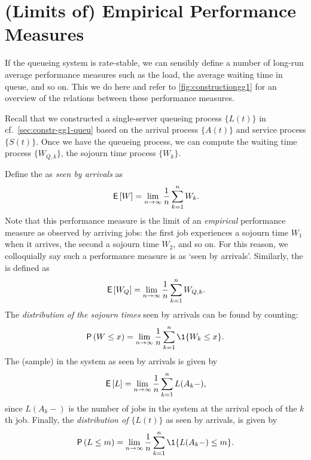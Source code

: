 \documentclass[companion]{subfiles}
\begin{document}
\section{(Limits of) Empirical Performance Measures}
\label{sec:limits-of-empirical}
If the queueing system is rate-stable, we can sensibly define a number of long-run average performance measures such as the load, the average waiting time in queue, and so on. 
This we do here and refer to \cref{fig:constructiongg1} for an overview of the relations between these performance measures.




Recall that we constructed a single-server queueing process $\{L(t)\}$ in cf.~\cref{sec:constr-gg1-queu} based on the arrival process $\{A(t)\}$ and service process $\{S(t)\}$.
Once we have the queueing process, we can compute the waiting time process $\{W_{Q,k}\}$, the sojourn time process $\{W_{k}\}$.


Define the  as \emph{seen by  arrivals} as
\begin{equation}\label{eq:49}
 \,\mathsf{E}\left[W\right] = \lim_{n\to\infty} \frac 1n\sum_{k=1}^n W_k.
\end{equation}
Note that this performance measure is the limit of an \emph{empirical} performance measure as observed by arriving jobs: the first job experiences a sojourn time $W_1$ when it arrives, the second a sojourn time $W_2$, and so on.
For this reason, we colloquially say such a performance measure is as `seen by arrivals'.
Similarly, the  is defined as
\begin{equation}\label{eq:50}
 \,\mathsf{E}\left[W_Q\right] = \lim_{n\to\infty} \frac 1 n\sum_{k=1}^n W_{Q,k}.
\end{equation}
The \emph{distribution of the sojourn times} seen by arrivals can be found by counting:
\begin{equation}\label{eq:48}
 \P{W \leq x} = \lim_{n\to\infty} \frac 1n\sum_{k=1}^n \1{W_k\leq x}.
\end{equation}
The (sample)  in the system as seen by arrivals is given by
\begin{equation}\label{eq:EQ}
\,\mathsf{E}\left[L\right] = \lim_{n\to\infty}\frac 1 n \sum_{k=1}^n L(A_k-),
\end{equation}
since $L(A_k-)$ is the number of jobs in the system at the arrival epoch of the $k$th job.
Finally, the \emph{distribution of $\{L(t)\}$} as seen by arrivals, is given by
\begin{equation}\label{eq:Qm}
\P{L\leq m} = \lim_{n\to\infty} \frac 1 n \sum_{k=1}^n \1{L(A_k-) \leq m}.
\end{equation}
\end{document}
